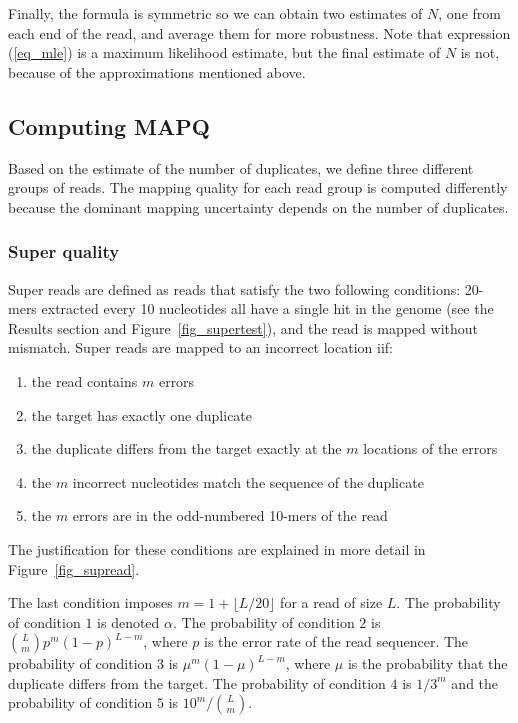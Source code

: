 \documentclass[a4,center,fleqn]{NAR}
\begin{document}
Finally, the formula is symmetric so we can obtain two estimates of $N$,
one from each end of the read, and average them for more robustness. Note
that expression (\ref{eq_mle}) is a maximum likelihood estimate, but the
final estimate of $N$ is not, because of the approximations mentioned
above.

\subsection{Computing MAPQ}

Based on the estimate of the number of duplicates, we define three
different groups of reads. The mapping quality for each read group
is computed differently because the dominant mapping uncertainty
depends on the number of duplicates.

\subsubsection{Super quality} Super reads are defined as reads that
satisfy the two following conditions: 20-mers extracted every 10
nucleotides all have a single hit in the genome (see the Results section
and Figure~\ref{fig_supertest}), and the read is mapped without mismatch.
Super reads are mapped to an incorrect location iif:
\begin{enumerate}
  \item the read contains $m$ errors
  \item the target has exactly one duplicate
  \item the duplicate differs from the target exactly at the $m$ locations
    of the errors
  \item the $m$ incorrect nucleotides match the sequence of the duplicate
  \item the $m$ errors are in the odd-numbered 10-mers of the read
\end{enumerate}
The justification for these conditions are explained in more detail in
Figure~\ref{fig_supread}.

The last condition imposes $m = 1 + \lfloor L/20 \rfloor$ for a read of size
$L$. The probability of condition $1$ is denoted $\alpha$. The probability
of condition $2$ is ${L \choose m}p^m(1-p)^{L-m}$, where $p$ is the error
rate of the read sequencer. The probability of condition $3$ is
$\mu^m(1-\mu)^{L-m}$, where $\mu$ is the probability that the duplicate
differs from the target. The probability of condition $4$ is $1/3^m$ and the
probability of condition $5$ is $10^m/{L\choose m}$.
\end{document}
